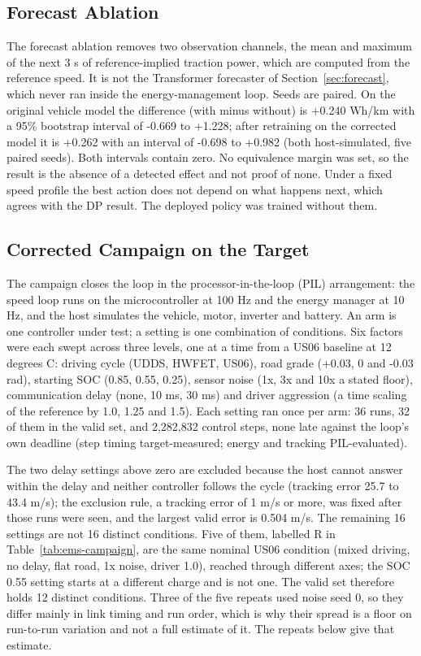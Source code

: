 \documentclass{ieeeaccess}
\begin{document}
\subsection{Forecast Ablation}

The forecast ablation removes two observation channels, the mean and maximum of the next 3 s of reference-implied traction power, which are computed from the reference speed. It is not the Transformer forecaster of Section~\ref{sec:forecast}, which never ran inside the energy-management loop. Seeds are paired. On the original vehicle model the difference (with minus without) is +0.240 Wh/km with a 95\% bootstrap interval of -0.669 to +1.228; after retraining on the corrected model it is +0.262 with an interval of -0.698 to +0.982 (both host-simulated, five paired seeds). Both intervals contain zero. No equivalence margin was set, so the result is the absence of a detected effect and not proof of none. Under a fixed speed profile the best action does not depend on what happens next, which agrees with the DP result. The deployed policy was trained without them.

\subsection{Corrected Campaign on the Target}

The campaign closes the loop in the processor-in-the-loop (PIL) arrangement: the speed loop runs on the microcontroller at 100 Hz and the energy manager at 10 Hz, and the host simulates the vehicle, motor, inverter and battery. An arm is one controller under test; a setting is one combination of conditions. Six factors were each swept across three levels, one at a time from a US06 baseline at 12 degrees C: driving cycle (UDDS, HWFET, US06), road grade (+0.03, 0 and -0.03 rad), starting SOC (0.85, 0.55, 0.25), sensor noise (1x, 3x and 10x a stated floor), communication delay (none, 10 ms, 30 ms) and driver aggression (a time scaling of the reference by 1.0, 1.25 and 1.5). Each setting ran once per arm: 36 runs, 32 of them in the valid set, and 2,282,832 control steps, none late against the loop's own deadline (step timing target-measured; energy and tracking PIL-evaluated).

The two delay settings above zero are excluded because the host cannot answer within the delay and neither controller follows the cycle (tracking error 25.7 to 43.4 m/s); the exclusion rule, a tracking error of 1 m/s or more, was fixed after those runs were seen, and the largest valid error is 0.504 m/s. The remaining 16 settings are not 16 distinct conditions. Five of them, labelled R in Table~\ref{tab:ems-campaign}, are the same nominal US06 condition (mixed driving, no delay, flat road, 1x noise, driver 1.0), reached through different axes; the SOC 0.55 setting starts at a different charge and is not one. The valid set therefore holds 12 distinct conditions. Three of the five repeats used noise seed 0, so they differ mainly in link timing and run order, which is why their spread is a floor on run-to-run variation and not a full estimate of it. The repeats below give that estimate.
\end{document}
